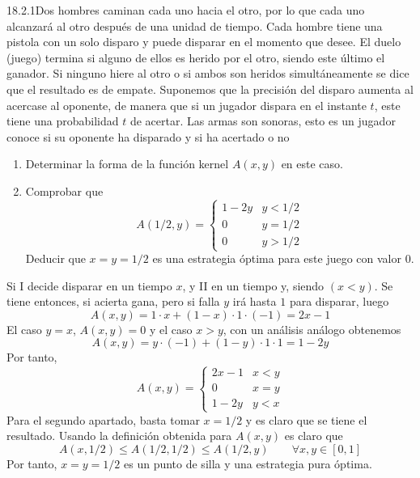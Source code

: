 \documentclass[twoside]{article}
\begin{document}
\begin{ejercicio}{18.2.1}Dos hombres caminan cada uno hacia el otro, por lo que cada uno alcanzará al otro después de una unidad de tiempo. Cada hombre tiene una pistola con un solo disparo y puede disparar en el momento que desee. El duelo (juego) termina si alguno de ellos es herido por el otro, siendo este último el ganador. Si ninguno hiere al otro o si ambos son heridos simultáneamente se dice que el resultado es de empate. Suponemos que la precisión del disparo aumenta al acercase al oponente, de manera que si un jugador dispara en el instante $t$, este tiene una probabilidad $t$ de acertar. Las armas son sonoras, esto es un jugador conoce si su oponente ha disparado y si ha acertado o no

\begin{enumerate}
\item Determinar la forma de la función kernel $A(x,y)$ en este caso.
\item Comprobar que 
$$
A(1/2,y)= \begin{cases}
1-2y & y<1/2\\
0 & y=1/2\\
0 & y>1/2
\end{cases}
$$
Deducir que $x = y = 1/2$ es una estrategia óptima para este juego con valor $0$.
\end{enumerate}
\end{ejercicio}
\begin{solucion}
Si I decide disparar en un tiempo $x$, y II en un tiempo y, siendo $(x < y)$. Se tiene entonces, si acierta gana, pero si falla $y$ irá hasta $1$ para disparar, luego
$$
A(x,y) =1\cdot x + (1-x)\cdot 1 \cdot (-1) = 2x-1
$$
El caso $y=x$, $A(x,y)=0$ y el caso $x>y$, con un análisis análogo obtenemos
$$
A(x,y) = y\cdot (-1) + (1-y)\cdot 1 \cdot 1 = 1-2y
$$
Por tanto,
$$
A(x,y)= \begin{cases}
2x-1 & x<y\\
0 & x=y\\
1-2y & y<x
\end{cases}
$$
Para el segundo apartado, basta tomar $x=1/2$ y es claro que se tiene el resultado. Usando la definición obtenida para $A(x,y)$ es claro que
$$
A(x,1/2) \leq A(1/2,1/2) \leq A(1/2,y) \qquad\forall x,y\in [0,1]
$$
Por tanto, $x=y=1/2$ es un punto de silla y una estrategia pura óptima.
\end{solucion}
\end{document}
